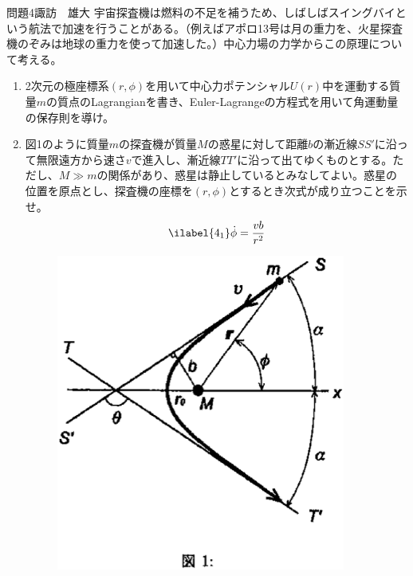 \documentclass[fleqn]{jbook}
\begin{document}
\begin{question}{問題4}{諏訪　雄大}
宇宙探査機は燃料の不足を補うため、しばしばスイングバイという航法で加速を行うことがある。（例えばアポロ13号は月の重力を、火星探査機のぞみは地球の重力を使って加速した。）中心力場の力学からこの原理について考える。
\begin{enumerate}
\item 2次元の極座標系$(r,\phi)$を用いて中心力ポテンシャル$U(r)$中を運動する質量$m$の質点のLagrangianを書き、Euler-Lagrangeの方程式を用いて角運動量の保存則を導け。
\item 図1のように質量$m$の探査機が質量$M$の惑星に対して距離$b$の漸近線$SS'$に沿って無限遠方から速さ$v$で進入し、漸近線$TT'$に沿って出てゆくものとする。ただし、$M\gg m$の関係があり、惑星は静止しているとみなしてよい。惑星の位置を原点とし、探査機の座標を$(r,\phi)$とするとき次式が成り立つことを示せ。
	\begin{eqnarray}\ilabel{4_1}
	\dot\phi=\frac{vb}{r^2}
	\end{eqnarray}

   	\begin{figure}[htbp]
	    \begin{center}
		\includegraphics[width=95mm]{2003phy4-1.eps}
	    \end{center}
	\end{figure}


\end{enumerate}
\end{question}
\end{document}
